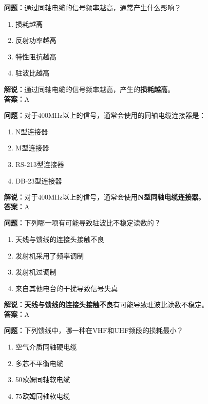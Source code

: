 \textbf{问题：}通过同轴电缆的信号频率越高，通常产生什么影响？

\begin{enumerate}[label=\Alph*), leftmargin=1.5cm]
	\item 损耗越高
	\item 反射功率越高
	\item 特性阻抗越高
	\item 驻波比越高
\end{enumerate}

\textbf{解说：}通过同轴电缆的信号频率越高，产生的\textbf{损耗越高}。\\\textbf{答案：}A%



\textbf{问题：}对于400MHz以上的信号，通常会使用的同轴电缆连接器是：

\begin{enumerate}[label=\Alph*), leftmargin=1.5cm]
	\item N型连接器
	\item M型连接器
	\item RS-213型连接器
	\item DB-23型连接器
\end{enumerate}

\textbf{解说：}对于400MHz以上的信号，通常会使用\textbf{N型同轴电缆连接器}。\\\textbf{答案：}A%



\textbf{问题：}下列哪一项有可能导致驻波比不稳定读数的？

\begin{enumerate}[label=\Alph*), leftmargin=1.5cm]
	\item 天线与馈线的连接头接触不良
	\item 发射机采用了频率调制
	\item 发射机过调制
	\item 来自其他电台的干扰导致信号失真
\end{enumerate}

\textbf{解说：}\textbf{天线与馈线的连接头接触不良}有可能导致驻波比读数不稳定。\\\textbf{答案：}A%



\textbf{问题：}下列馈线中，哪一种在VHF和UHF频段的损耗最小？

\begin{enumerate}[label=\Alph*), leftmargin=1.5cm]
	\item 空气介质同轴硬电缆
	\item 多芯不平衡电缆
	\item 50欧姆同轴软电缆
	\item 75欧姆同轴软电缆
\end{enumerate}

